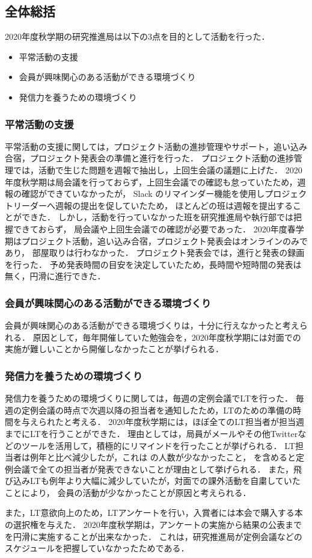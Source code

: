 \subsection*{全体総括}


2020年度秋学期の研究推進局は以下の3点を目的として活動を行った．
\begin{itemize}
\item 平常活動の支援
\item 会員が興味関心のある活動ができる環境づくり
\item 発信力を養うための環境づくり
\end{itemize}

\subsubsection*{平常活動の支援}
平常活動の支援に関しては，プロジェクト活動の進捗管理やサポート，追い込み合宿，プロジェクト発表会の準備と進行を行った．
プロジェクト活動の進捗管理では，活動で生じた問題を週報で抽出し，上回生会議の議題に上げた．
2020年度秋学期は局会議を行っておらず，上回生会議での確認も怠っていたため，週報の確認ができていなかったが，
Slack のリマインダー機能を使用しプロジェクトリーダーへ週報の提出を促していたため，
ほとんどの班は週報を提出することができた．
しかし，活動を行っていなかった班を研究推進局や執行部では把握できておらず，
局会議や上回生会議での確認が必要であった．
2020年度春学期はプロジェクト活動，追い込み合宿，プロジェクト発表会はオンラインのみであり，
部屋取りは行わなかった．
プロジェクト発表会では，進行と発表の録画を行った．
予め発表時間の目安を決定していたため，長時間や短時間の発表は無く，円滑に進行できた．

\subsubsection*{会員が興味関心のある活動ができる環境づくり}
会員が興味関心のある活動ができる環境づくりは，十分に行えなかったと考えられる．
原因として，毎年開催していた勉強会を，2020年度秋学期には対面での実施が難しいことから開催しなかったことが挙げられる．

\subsubsection*{発信力を養うための環境づくり}
発信力を養うための環境づくりに関しては，毎週の定例会議でLTを行った．
毎週の定例会議の時点で次週以降の担当者を通知したため，LTのための準備の時間を与えられたと考える．
2020年度秋学期には，ほぼ全てのLT担当者が担当週までにLTを行うことができた．
理由としては，局員がメールやその他Twitterなどのツールを活用して，積極的にリマインドを行ったことが挙げられる．
LT担当者は例年と比べ減少したが，これは \firstGrade の人数が少なかったこと，
\secondGrade を含めると定例会議で全ての担当者が発表できないことが理由として挙げられる．
また，飛び込みLTも例年より大幅に減少していたが，対面での課外活動を自粛していたことにより，
会員の活動が少なかったことが原因と考えられる．

また，LT意欲向上のため，LTアンケートを行い，入賞者には本会で購入する本の選択権を与えた．
2020年度秋学期は，アンケートの実施から結果の公表までを円滑に実施することが出来なかった．
これは，研究推進局が定例会議などのスケジュールを把握していなかったためである．
